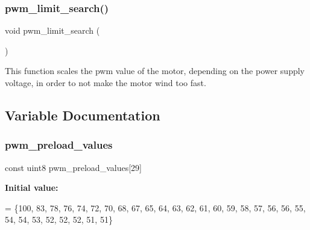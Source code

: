 \subsubsection{pwm\+\_\+limit\+\_\+search()}
{\footnotesize\ttfamily void pwm\+\_\+limit\+\_\+search (\begin{DoxyParamCaption}{ }\end{DoxyParamCaption})}

This function scales the pwm value of the motor, depending on the power supply voltage, in order to not make the motor wind too fast. 

\subsection{Variable Documentation}
\mbox{\label{interruptions_8c_aee1865719263cf20251f918e8825703d}} 
\subsubsection{pwm\+\_\+preload\+\_\+values}
{\footnotesize\ttfamily const uint8 pwm\+\_\+preload\+\_\+values[29]\hspace{0.3cm}{\ttfamily [static]}}

{\bfseries Initial value\+:}
\begin{DoxyCode}
= \{100,    
                                              83,
                                              78,
                                              76,
                                              74,
                                              72,    
                                              70,
                                              68,
                                              67,
                                              65,
                                              64,    
                                              63,
                                              62,
                                              61,
                                              60,
                                              59,    
                                              58,
                                              57,
                                              56,
                                              56,
                                              55,    
                                              54,
                                              54,
                                              53,
                                              52,
                                              52,    
                                              52,
                                              51,
                                              51\}
\end{DoxyCode}

